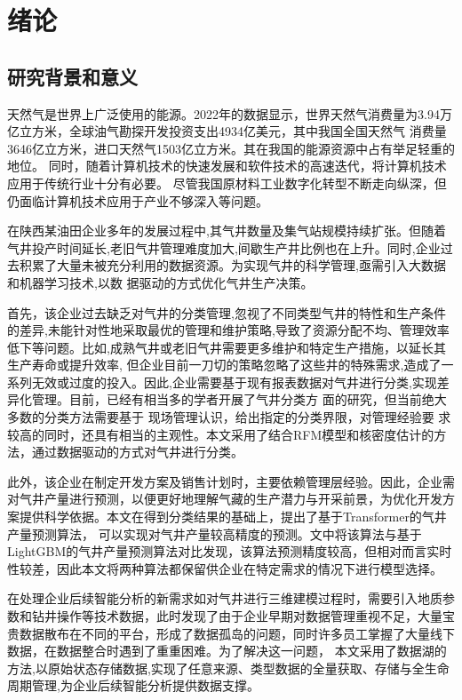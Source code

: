 \chapter{绪论}
\section{研究背景和意义}
天然气是世界上广泛使用的能源。2022年的数据显示，世界天然气消费量为3.94万亿立方米，全球油气勘探开发投资支出4934亿美元，其中我国全国天然气
消费量3646亿立方米，进口天然气1503亿立方米\cite{chinaGasGOv}。其在我国的能源资源中占有举足轻重的地位。
同时，随着计算机技术的快速发展和软件技术的高速迭代，将计算机技术应用于传统行业十分有必要。
尽管我国原材料工业数字化转型不断走向纵深，但仍面临计算机技术应用于产业不够深入等问题\cite{workplanForPetrochemical}。

在陕西某油田企业多年的发展过程中,其气井数量及集气站规模持续扩张。但随着气井投产时间延长,老旧气井管理难度加大,间歇生产井比例也在上升。同时,企业过去积累了大量未被充分利用的数据资源。为实现气井的科学管理,亟需引入大数据和机器学习技术,以数
据驱动的方式优化气井生产决策。

首先，该企业过去缺乏对气井的分类管理,忽视了不同类型气井的特性和生产条件的差异,未能针对性地采取最优的管理和维护策略,导致了资源分配不均、管理效率低下等问题。比如,成熟气井或老旧气井需要更多维护和特定生产措施，以延长其生产寿命或提升效率,
但企业目前一刀切的策略忽略了这些井的特殊需求,造成了一系列无效或过度的投入。因此,企业需要基于现有报表数据对气井进行分类,实现差异化管理。目前，已经有相当多的学者开展了气井分类方
面的研究，但当前绝大多数的分类方法需要基于
现场管理认识，给出指定的分类界限，对管理经验要
求较高的同时，还具有相当的主观性\cite{SYZC202104015}。本文采用了结合RFM模型\cite{birant2011data}和核密度估计\cite{chen2017tutorial}的方法，通过数据驱动的方式对气井进行分类。

此外，该企业在制定开发方案及销售计划时，主要依赖管理层经验。因此，企业需对气井产量进行预测，以便更好地理解气藏的生产潜力与开采前景，为优化开发方案提供科学依据。本文在得到分类结果的基础上，提出了基于Transformer的气井产量预测算法，
可以实现对气井产量较高精度的预测。文中将该算法与基于LightGBM的气井产量预测算法对比发现，该算法预测精度较高，但相对而言实时性较差，因此本文将两种算法都保留供企业在特定需求的情况下进行模型选择。

在处理企业后续智能分析的新需求如对气井进行三维建模过程时，需要引入地质参数和钻井操作等技术数据，此时发现了由于企业早期对数据管理重视不足，大量宝贵数据散布在不同的平台，形成了数据孤岛的问题，同时许多员工掌握了大量线下数据，在数据整合时遇到了重重困难。为了解决这一问题，
本文采用了数据湖的方法,以原始状态存储数据,实现了任意来源、类型数据的全量获取、存储与全生命周期管理,为企业后续智能分析提供数据支撑。

